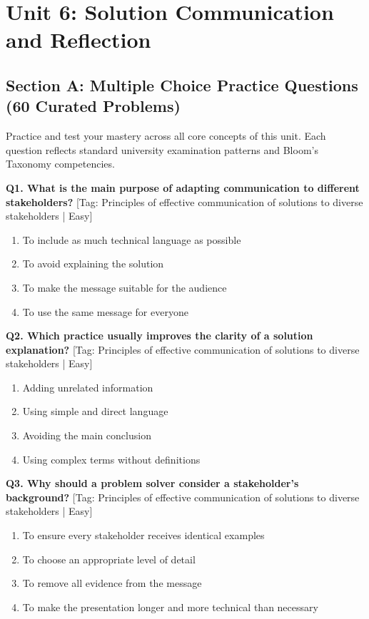 \chapter{Unit 6: Solution Communication and Reflection}


\section{Section A: Multiple Choice Practice Questions (60 Curated Problems)}

\noindent Practice and test your mastery across all core concepts of this unit. Each question reflects standard university examination patterns and Bloom's Taxonomy competencies.
\vspace{3mm}

\noindent\textbf{Q1. What is the main purpose of adapting communication to different stakeholders?} \hfill [Tag: Principles of effective communication of solutions to diverse stakeholders | Easy]
\begin{enumerate}[label=(\alph*),topsep=2pt,itemsep=1pt,partopsep=0pt,parsep=0pt]
    \item {To include as much technical language as possible}
    \item {To avoid explaining the solution}
    \item {To make the message suitable for the audience}
    \item {To use the same message for everyone}
\end{enumerate}
\vspace{2mm}

\noindent\textbf{Q2. Which practice usually improves the clarity of a solution explanation?} \hfill [Tag: Principles of effective communication of solutions to diverse stakeholders | Easy]
\begin{enumerate}[label=(\alph*),topsep=2pt,itemsep=1pt,partopsep=0pt,parsep=0pt]
    \item {Adding unrelated information}
    \item {Using simple and direct language}
    \item {Avoiding the main conclusion}
    \item {Using complex terms without definitions}
\end{enumerate}
\vspace{2mm}

\noindent\textbf{Q3. Why should a problem solver consider a stakeholder's background?} \hfill [Tag: Principles of effective communication of solutions to diverse stakeholders | Easy]
\begin{enumerate}[label=(\alph*),topsep=2pt,itemsep=1pt,partopsep=0pt,parsep=0pt]
    \item {To ensure every stakeholder receives identical examples}
    \item {To choose an appropriate level of detail}
    \item {To remove all evidence from the message}
    \item {To make the presentation longer and more technical than necessary}
\end{enumerate}
\vspace{2mm}

